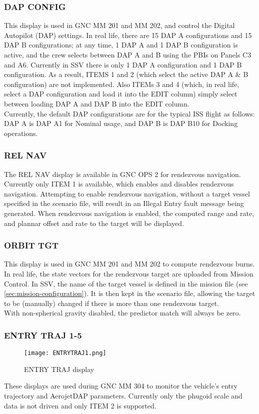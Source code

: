 \documentclass[Space_Shuttle_Vessel_Manual.tex]{subfiles}
\begin{document}
\begin{multicols*}{2}
\subsubsection{DAP CONFIG}
This display is used in GNC MM 201 and MM 202, and control the Digital Autopilot (DAP) settings. In real life, there are 15 DAP A configurations and 15 DAP B configurations; at any time, 1 DAP A and 1 DAP B configuration is active, and the crew selects between DAP A and B using the PBIs on Panels C3 and A6. Currently in SSV there is only 1 DAP A configuration and 1 DAP B configuration. As a result, ITEMS 1 and 2 (which select the active DAP A \& B configuration) are not implemented. Also ITEMs 3 and 4 (which, in real life, select a DAP configuration and load it into the EDIT column) simply select between loading DAP A and DAP B into the EDIT column.\\
Currently, the default DAP configurations are for the typical ISS flight as follows: DAP A is DAP A1 for Nominal usage, and DAP B is DAP B10 for Docking operations.

\subsubsection{REL NAV}
The REL NAV display is available in GNC OPS 2 for rendezvous navigation. Currently only ITEM 1 is available, which enables and disables rendezvous navigation. Attempting to enable rendezvous navigation, without a target vessel specified in the scenario file, will result in an Illegal Entry fault message being generated. When rendezvous navigation is enabled, the computed range and rate, and plannar offset and rate to the target will be displayed.

\subsubsection{ORBIT TGT}
This display is used in GNC MM 201 and MM 202 to compute rendezvous burns. In real life, the state vectors for the rendezvous target are uploaded from Mission Control. In SSV, the name of the target vessel is defined in the mission file (see \ref{sec:mission-configuration}). It is then kept in the scenario file, allowing the target to be (manually) changed if there is more than one rendezvous target.\\
With non-spherical gravity disabled, the predictor match will always be zero.

\subsubsection{ENTRY TRAJ 1-5}
\begin{figure}[H]
  \texttt{[image: ENTRYTRAJ1.png]}
  \caption{ENTRY TRAJ display}
  \label{fig:ENTRY_TRAJ}
\end{figure}
These displays are used during GNC MM 304 to monitor the vehicle's entry trajectory and AerojetDAP parameters. Currently only the phugoid scale and data is not driven and only ITEM 2 is supported.


\end{multicols*}
\end{document}

